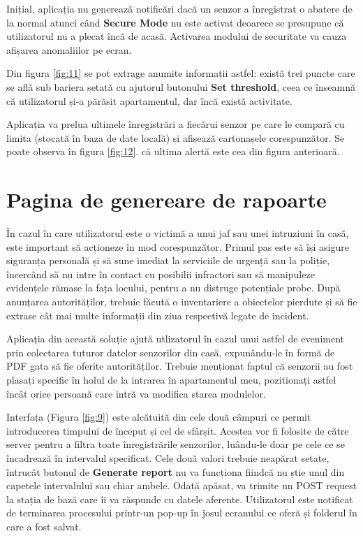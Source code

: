 Inițial, aplicația nu generează notificări dacă un senzor a înregistrat o abatere de la normal atunci când \textbf{Secure Mode} nu este activat deoarece se presupune că utilizatorul nu a plecat încă de acasă. Activarea modului de securitate va cauza afișarea anomaliilor pe ecran.

Din figura \ref{fig:11} se pot extrage anumite informații astfel: există trei puncte care se află sub bariera setată cu ajutorul butonului \textbf{Set threshold}, ceea ce înseamnă că utilizatorul și-a părăsit apartamentul, dar încă există activitate. 

Aplicația va prelua ultimele înregistrări a fiecărui senzor pe care le compară cu limita (stocată în baza de date locală) și afișează cartonașele corespunzător. Se poate observa în figura \ref{fig:12}. că ultima alertă este cea din figura anterioară.

\break

\section{Pagina de genereare de rapoarte}

În cazul în care utilizatorul este o victimă a unui jaf sau unei intruziuni în casă, este important să acționeze în mod corespunzător. Primul pas este să își asigure siguranța personală și să sune imediat la serviciile de urgență sau la poliție, încercând să nu intre în contact cu posibilii infractori sau să manipuleze evidențele rămase la fața locului, pentru a nu distruge potențiale probe. După anunțarea autorităților, trebuie făcută o inventariere a obiectelor pierdute și să fie extrase cât mai multe informații din ziua respectivă legate de incident.

Aplicația din această soluție ajută utlizatorul în cazul unui astfel de eveniment prin colectarea tuturor datelor senzorilor din casă, expunându-le în formă de PDF gata să fie oferite autorităților. Trebuie menționat faptul că senzorii au fost plasați specific în holul de la intrarea în apartamentul meu, pozitionați astfel încât orice persoană care intră va modifica starea modulelor.

Interfața (Figura \ref{fig:9}) este alcătuită din cele două câmpuri ce permit introducerea timpului de început și cel de sfârșit. Acestea vor fi folosite de către server pentru a filtra toate înregistrările senzorilor, luându-le doar pe cele ce se încadrează în intervalul specificat. Cele două valori trebuie neapărat setate, întrucât butonul de \textbf{Generate report} nu va funcționa fiindcă nu știe unul din capetele intervalului sau chiar ambele. Odată apăsat, va trimite un POST request la stația de bază care îi va răspunde cu datele aferente. Utilizatorul este notificat de terminarea procesului printr-un pop-up în josul ecranului ce oferă și folderul în care a fost salvat.

